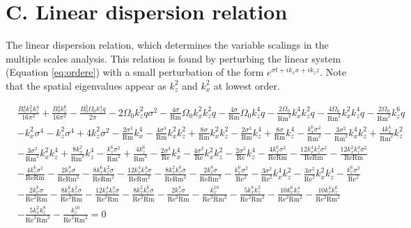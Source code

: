 \documentclass{emulateapj}
\newcommand{\beq}{\begin{equation}}
\newcommand{\eeq}{\end{equation}}
\newcommand\reye{\mathrm{Re}}
\newcommand\reym{\mathrm{Rm}}
\begin{document}
\section{C. Linear dispersion relation}\label{app:dispersion}

The linear dispersion relation, which determines the variable scalings in the multiple scales analysis. This relation is found by perturbing the linear system (Equation \ref{eq:ordere}) with a small perturbation of the form $e^{\sigma t + i k_x x + i k_z z}$. Note that the spatial eigenvalues appear as $k_z^2$ and $k_x^2$ at lowest order.

\beq
\begin{split}
& \frac{B_{0}^{4} k_{x}^{2} k_{z}^{4}}{16 \pi^{2}} + \frac{B_{0}^{4} k_{z}^{6}}{16 \pi^{2}} - \frac{B_{0}^{2} \Omega_{0} k_{z}^{4} q}{2 \pi} - 2 \Omega_{0} k_{z}^{2} q \sigma^{2} - \frac{4 \sigma}{\reym} \Omega_{0} k_{x}^{2} k_{z}^{2} q - \frac{4 \sigma}{\reym} \Omega_{0} k_{z}^{4} q - \frac{2 \Omega_{0}}{\reym^{2}} k_{x}^{4} k_{z}^{2} q - \frac{4 \Omega_{0}}{\reym^{2}} k_{x}^{2} k_{z}^{4} q - \frac{2 \Omega_{0}}{\reym^{2}} k_{z}^{6} q \\
& - k_{x}^{2} \sigma^{4} - k_{z}^{2} \sigma^{4} + 4 k_{z}^{2} \sigma^{2} - \frac{2 \sigma^{3}}{\reym} k_{x}^{4} - \frac{4 \sigma^{3}}{\reym} k_{x}^{2} k_{z}^{2} + \frac{8 \sigma}{\reym} k_{x}^{2} k_{z}^{2} - \frac{2 \sigma^{3}}{\reym} k_{z}^{4} + \frac{8 \sigma}{\reym} k_{z}^{4} - \frac{k_{x}^{6} \sigma^{2}}{\reym^{2}} - \frac{3 \sigma^{2}}{\reym^{2}} k_{x}^{4} k_{z}^{2} + \frac{4 k_{x}^{4}}{\reym^{2}} k_{z}^{2} \\
& - \frac{3 \sigma^{2}}{\reym^{2}} k_{x}^{2} k_{z}^{4} + \frac{8 k_{x}^{2}}{\reym^{2}} k_{z}^{4} - \frac{k_{z}^{6} \sigma^{2}}{\reym^{2}} + \frac{4 k_{z}^{6}}{\reym^{2}} - \frac{2 \sigma^{3}}{\reye} k_{x}^{4} - \frac{4 \sigma^{3}}{\reye} k_{x}^{2} k_{z}^{2} - \frac{2 \sigma^{3}}{\reye} k_{z}^{4} - \frac{4 k_{x}^{6} \sigma^{2}}{\reye \reym} -  \frac{12 k_{x}^{4} k_{z}^{2} \sigma^{2}}{\reye \reym} - \frac{12 k_{x}^{2} k_{z}^{4} \sigma^{2}}{\reye \reym} \\
& - \frac{4 k_{z}^{6} \sigma^{2}}{\reye \reym} - \frac{2 k_{x}^{8} \sigma}{\reye \reym^{2}} - \frac{8 k_{x}^{6} k_{z}^{2} \sigma}{\reye \reym^{2}} - \frac{12 k_{x}^{4} k_{z}^{4} \sigma}{\reye \reym^{2}} - \frac{8 k_{x}^{2} k_{z}^{6} \sigma}{\reye \reym^{2}} - \frac{2 k_{z}^{8} \sigma}{\reye \reym^{2}} - \frac{k_{x}^{6} \sigma^{2}}{\reye^{2}} - \frac{3 \sigma^{2}}{\reye^{2}} k_{x}^{4} k_{z}^{2} - \frac{3 \sigma^{2}}{\reye^{2}} k_{x}^{2} k_{z}^{4} - \frac{k_{z}^{6} \sigma^{2}}{\reye^{2}} \\
& - \frac{2 k_{x}^{8} \sigma}{\reye^{2} \reym} - \frac{8 k_{x}^{6} k_{z}^{2} \sigma}{\reye^{2} \reym} - \frac{12 k_{x}^{4} k_{z}^{4} \sigma}{\reye^{2} \reym} - \frac{8 k_{x}^{2} k_{z}^{6} \sigma}{\reye^{2} \reym} - \frac{2 k_{z}^{8} \sigma}{\reye^{2} \reym} - \frac{k_{x}^{10}}{\reye^{2} \reym^{2}} - \frac{5 k_{x}^{8} k_{z}^{2}}{\reye^{2} \reym^{2}} - \frac{10 k_{x}^{6} k_{z}^{4}}{\reye^{2} \reym^{2}} - \frac{10 k_{x}^{4} k_{z}^{6}}{\reye^{2} \reym^{2}} \\
& - \frac{5 k_{x}^{2} k_{z}^{8}}{\reye^{2} \reym^{2}} - \frac{k_{z}^{10}}{\reye^{2} \reym^{2}} = 0
\end{split}
\eeq
\end{document}
